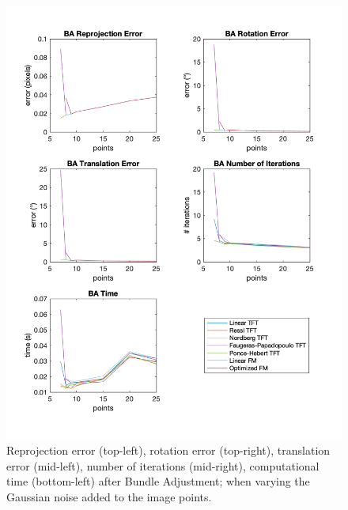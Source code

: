 \begin{figure}[p]
	\centering
	\includegraphics[width=1\textwidth]{Experiments/Synthetic/points/BApointsPlots.png}
	\caption{Reprojection error (top-left), rotation error (top-right), translation error (mid-left), number of iterations (mid-right), computational time (bottom-left) after Bundle Adjustment; when varying the Gaussian noise added to the image points.}
\end{figure}

